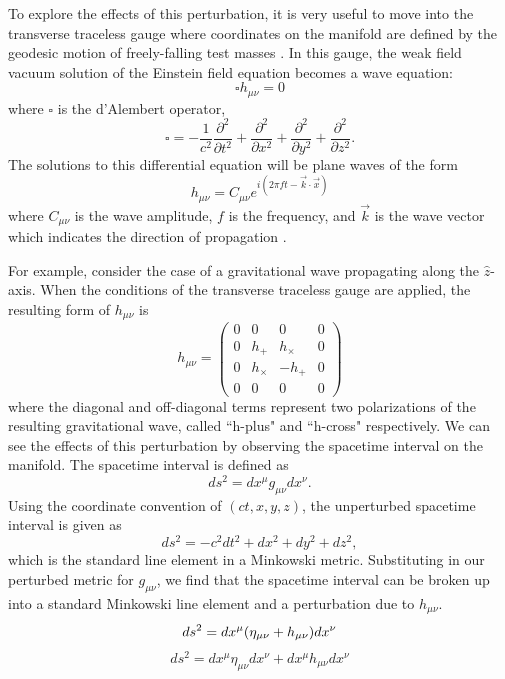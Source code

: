 To explore the effects of this perturbation, it is very useful to move 
into the transverse traceless 
gauge where coordinates on the manifold are defined by the geodesic 
motion of freely-falling test masses \cite{Saulson:1994}. In this gauge, the weak field 
vacuum solution of the Einstein field equation becomes a wave equation: 
\begin{equation}
\square h_{\mu\nu} = 0
\end{equation}
where $\square$ is the d'Alembert operator, 
\begin{equation}
\square = -\frac{1}{c^2}\frac{\partial^2}{\partial t^2} + \frac{\partial^2}{\partial x^2} 
          + \frac{\partial^2}{\partial y^2} + \frac{\partial^2}{\partial z^2}.
\end{equation}
The solutions to this differential equation will be plane waves of 
the form
\begin{equation}
h_{\mu\nu} = C_{\mu\nu}e^{i(2\pi ft - \vec{k}\cdot\vec{x})}
\end{equation}
where $C_{\mu\nu}$ is the wave amplitude, $f$ is the frequency, 
and $\vec{k}$ is the wave vector which indicates the direction of 
propagation \cite{Carroll}.

For example, consider the case of a gravitational 
wave propagating along the $\hat{z}$-axis.
When the conditions of the transverse traceless gauge are applied, 
the resulting form of $h_{\mu\nu}$ is 
\begin{equation}
h_{\mu\nu} = 
  \begin{pmatrix}
    0 & 0 & 0 & 0 \\
    0 & h_+ & h_\times & 0 \\
    0 & h_\times & -h_+ & 0 \\
    0 & 0 & 0 & 0
  \end{pmatrix}
\label{eq:strain}
\end{equation}
where the diagonal and off-diagonal terms represent two polarizations 
of the resulting gravitational wave, called ``h-plus" and ``h-cross" 
respectively.
We can see the effects of this perturbation by observing the  
spacetime interval on the manifold. The spacetime interval is defined as 
\begin{equation}
ds^2 = dx^\mu g_{\mu\nu}dx^\nu.
\end{equation}
Using the coordinate convention of $(ct,x,y,z)$, the unperturbed
spacetime interval is given as 
\begin{equation}
ds^2 = -c^2 dt^2 + dx^2 + dy^2 + dz^2,
\end{equation}
which is the standard line element in a Minkowski metric. 
Substituting in our perturbed metric for $g_{\mu\nu}$, we find that 
the spacetime interval can be broken up into a standard Minkowski line 
element and a perturbation due to $h_{\mu\nu}$.
\begin{equation}
ds^2 = dx^\mu (\eta_{\mu\nu} + h_{\mu\nu})dx^\nu \\
\end{equation}
\begin{equation}
ds^2 = dx^\mu \eta_{\mu\nu} dx^\nu + dx^\mu h_{\mu\nu}dx^\nu
\label{eq:spacetime}
\end{equation}

